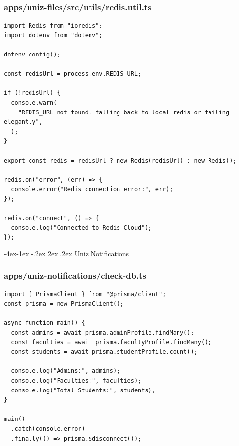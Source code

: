 \documentclass[11pt,a4paper,oneside]{article}
\makeatletter
\renewcommand{\subsection}{\@startsection{subsection}{2}{\z@}%
    {-4ex\@plus -1ex \@minus -.2ex}%
    {2ex \@plus .2ex}%
    {\normalfont\Large\bfseries\color{accent}}}
\makeatother
\begin{document}
\subsubsection*{apps/uniz-files/src/utils/redis.util.ts}
\begin{lstlisting}
import Redis from "ioredis";
import dotenv from "dotenv";

dotenv.config();

const redisUrl = process.env.REDIS_URL;

if (!redisUrl) {
  console.warn(
    "REDIS_URL not found, falling back to local redis or failing elegantly",
  );
}

export const redis = redisUrl ? new Redis(redisUrl) : new Redis();

redis.on("error", (err) => {
  console.error("Redis connection error:", err);
});

redis.on("connect", () => {
  console.log("Connected to Redis Cloud");
});

\end{lstlisting}

\subsection{Uniz Notifications}
\subsubsection*{apps/uniz-notifications/check-db.ts}
\begin{lstlisting}
import { PrismaClient } from "@prisma/client";
const prisma = new PrismaClient();

async function main() {
  const admins = await prisma.adminProfile.findMany();
  const faculties = await prisma.facultyProfile.findMany();
  const students = await prisma.studentProfile.count();

  console.log("Admins:", admins);
  console.log("Faculties:", faculties);
  console.log("Total Students:", students);
}

main()
  .catch(console.error)
  .finally(() => prisma.$disconnect());

\end{lstlisting}
\end{document}
